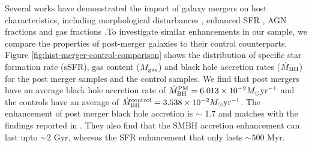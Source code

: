 \documentclass[11pt, letterpaper]{article}
\begin{document}
Several works have demonstrated the impact of galaxy mergers on host characteristics, including morphological disturbances \citep{DeGraf_2021,Patton2016}, enhanced SFR \citep{Ellison_2008,Ellison_2013} , AGN fractions \citep{Satyapal_2014,Ellison_2011} and gas fractions \citep{Ellison_2018}.To investigate similar enhancements in our sample, we compare the properties of post-merger galaxies to their control counterparts. Figure \ref{fig:hist-merger-control-comparison} shows the distribution of specific star formation rate (sSFR), gas content ($M_{\rm gas}$) and black hole accretion rates ($\dot{M}_{\rm BH}$) for the post merger samples and the control samples. We find that post mergers have an average black hole accretion rate of $\dot{M}^{\rm PM}_{\rm BH} = 6.013 \times 10^{-2} M_{\odot} \rm yr^{-1}$ and the controls have an average of $\dot{M}^{\rm control}_{\rm BH} = 3.538 \times 10^{-2}M_{\odot} \rm yr^{-1}$. The enhancement of post merger black hole accretion is $\sim$ 1.7 and matches with the findings reported in \cite{Byrne_Mamahit_2022}. They also find that the SMBH accretion enhancement can last upto $\sim 2$ Gyr, whereas the SFR enhancement that only lasts $\sim 500$ Myr. 
\end{document}
